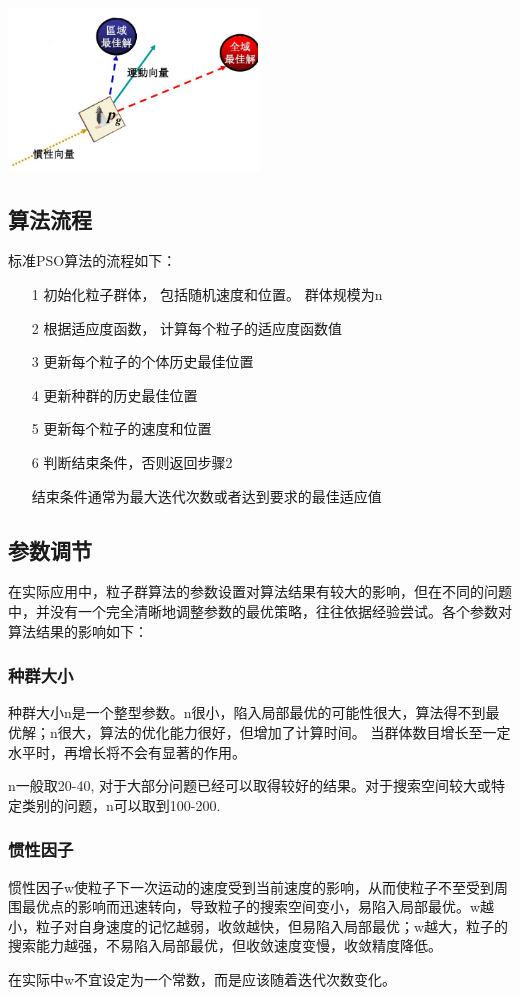 \documentclass[8pt]{article}
\begin{document}
\centerline{\includegraphics[width=0.5\textwidth]{1.png}}

\subsection{算法流程}
标准PSO算法的流程如下：
\begin{itemize}[leftmargin=4em]
	\setlength{\itemsep}{0pt}
	\setlength{\parsep}{0pt}
	\setlength{\parskip}{0pt}
	\item[1] 初始化粒子群体， 包括随机速度和位置。 群体规模为n
	\item[2] 根据适应度函数， 计算每个粒子的适应度函数值
    \item[3] 更新每个粒子的个体历史最佳位置
    \item[4] 更新种群的历史最佳位置
    \item[5] 更新每个粒子的速度和位置
	\item[6] 判断结束条件，否则返回步骤2

结束条件通常为最大迭代次数或者达到要求的最佳适应值
\end{itemize}

\subsection{参数调节}
在实际应用中，粒子群算法的参数设置对算法结果有较大的影响，但在不同的问题中，并没有一个完全清晰地调整参数的最优策略，往往依据经验尝试。各个参数对算法结果的影响如下：
\subsubsection{种群大小}
	种群大小n是一个整型参数。n很小，陷入局部最优的可能性很大，算法得不到最优解；n很大，算法的优化能力很好，但增加了计算时间。
	当群体数目增长至一定水平时，再增长将不会有显著的作用。
\par
	n一般取20-40, 对于大部分问题已经可以取得较好的结果。对于搜索空间较大或特定类别的问题，n可以取到100-200.

\subsubsection{惯性因子}
	惯性因子w使粒子下一次运动的速度受到当前速度的影响，从而使粒子不至受到周围最优点的影响而迅速转向，导致粒子的搜索空间变小，易陷入局部最优。w越小，粒子对自身速度的记忆越弱，收敛越快，但易陷入局部最优；w越大，粒子的搜索能力越强，不易陷入局部最优，但收敛速度变慢，收敛精度降低。
\par
	在实际中w不宜设定为一个常数，而是应该随着迭代次数变化。
\end{document}
